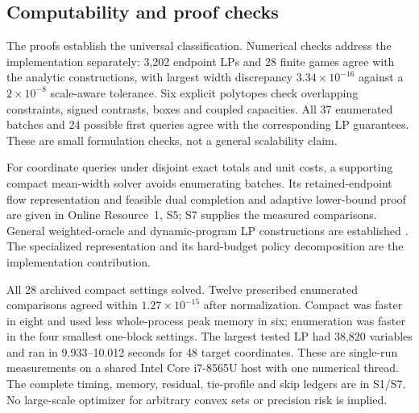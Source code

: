 \subsection{Computability and proof checks}
The proofs establish the universal classification. Numerical checks address
the implementation separately: 3,202 endpoint LPs and 28 finite games agree
with the analytic constructions, with largest width discrepancy
$3.34\times10^{-16}$ against a $2\times10^{-8}$ scale-aware tolerance.
Six explicit polytopes check overlapping constraints, signed contrasts,
boxes and coupled capacities. All 37 enumerated batches and 24 possible
first queries agree with the corresponding LP guarantees. These are small
formulation checks, not a general scalability claim.

For coordinate queries under disjoint exact totals and unit costs, a
supporting compact mean-width solver avoids enumerating batches.
Its retained-endpoint flow representation and feasible dual completion
and adaptive lower-bound proof are given in Online Resource~1, S5;
S7 supplies the measured comparisons. General weighted-oracle
and dynamic-program LP constructions are established
\citep{kawase2024,martin1990}. The specialized representation and its
hard-budget policy decomposition are the implementation contribution.

All 28 archived compact settings solved. Twelve prescribed enumerated
comparisons agreed within $1.27\times10^{-15}$ after normalization.
Compact was faster in eight and used less whole-process peak memory in
six; enumeration was faster in the four smallest one-block settings.
The largest tested LP had 38,820 variables and ran in 9.933--10.012 seconds
for 48 target coordinates. These are single-run measurements on a shared
Intel Core i7-8565U host with one numerical thread. The complete timing,
memory, residual, tie-profile and skip ledgers are in S1/S7.
No large-scale optimizer for arbitrary convex sets or precision risk is implied.
